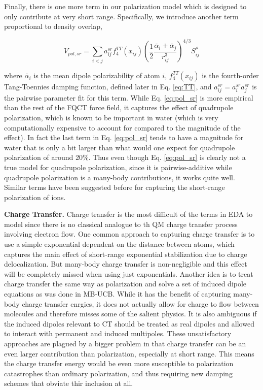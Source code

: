 \documentclass[journal=jctcce,manuscript=article]{achemso}
\begin{document}
Finally, there is one more term in our polarization model which is designed to only contribute at very
short range. Specifically, we introduce another term proportional to density overlap,

\begin{equation}
  V_{pol,sr}=\sum_{i<j}a_{ij}^{sr}f_4^{TT}(x_{ij})\left(\frac{1}{2}\frac{\bar{\alpha}_i + \bar{\alpha}_j}{r_{ij}^3}\right)^{4/3}S_{ij}^{\rho}
\label{eq:pol_sr}
\end{equation}

where $\bar{\alpha}_i$ is the mean dipole polarizability of atom $i$, $f_4^{TT}(x_{ij})$
is the fourth-order Tang-Toennies damping function, defined later in Eq. \ref{eq:TT}, and $a_{ij}^{sr}=a_{i}^{sr}a_{j}^{sr}$ is
the pairwise parameter fit for this term. While Eq. \ref{eq:pol_sr} is more empirical than the rest of the FQCT force field, it captures the effect of quadrupole polarization, which is known to be important
in water\cite{herman2023accurate} (which is very computationally expensive to account for compared to the magnitude of the effect). In fact the last term in Eq. \ref{eq:pol_sr} tends to have a magnitude for water
that is only a bit larger than what would one expect for quadrupole polarization of around 20\%. Thus even though Eq. \ref{eq:pol_sr} is clearly
not a true model for quadrupole polarization, since it is pairwise-additive
while quadrupole polarization is a many-body contributions, it works quite well. Similar terms
have been suggested before for capturing the short-range polarization of ions.\cite{sheng2022semiempirical}

\textbf{Charge Transfer.} Charge transfer is the most difficult of the terms in EDA to model since there is no classical analogue to th QM charge transfer process involving electron flow. One common approach to
capturing charge transfer is to use a simple exponential dependent on the distance
between atoms\cite{rackers2021polarizable}, which captures the main effect of short-range exponential stabilization due to charge delocalization. But many-body charge transfer is non-negligible and this effect will be completely
missed when using just exponentials. Another idea is to treat charge transfer the same way as polarization and solve a set of induced dipole equations as was done in MB-UCB.\cite{das2019development,wang2023general}
While it has the benefit of capturing many-body charge transfer enrgies, it does not actually allow for charge to flow between molecules
and therefore misses some of the salient physics. It is also ambiguous if the induced
dipoles relevant to CT should be treated as real dipoles and allowed to interact 
with permanent and induced multipoles. These unsatisfactory approaches are plagued by a bigger problem in that charge transfer can be an even larger contribution than polarization, especially at short range. This means the charge transfer energy would be even more susceptible to
polarization catastrophes than ordinary polarization, and thus requiring new damping schemes that obviate thir inclusion at all.
\end{document}
